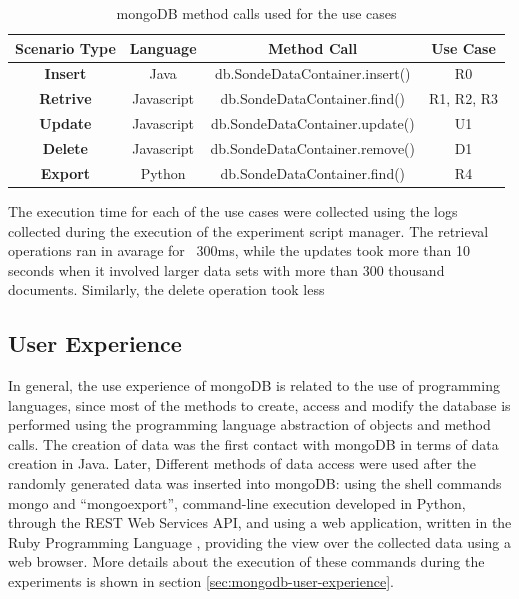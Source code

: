 \begin{table}
    \begin{center}
        \begin{tabular}{|c|c|c|c|}\hline
        \textbf{Scenario Type} & \textbf{Language} & \textbf{Method Call} & \textbf{Use Case}\\\hline 
        \textbf{Insert} & Java & db.SondeDataContainer.insert() & R0\\\hline
        \textbf{Retrive} & Javascript & db.SondeDataContainer.find() & R1, R2, R3\\\hline 
        \textbf{Update} & Javascript & db.SondeDataContainer.update() & U1\\\hline 
        \textbf{Delete} & Javascript & db.SondeDataContainer.remove() & D1\\\hline
        \textbf{Export} & Python & db.SondeDataContainer.find() & R4\\\hline
        \end{tabular}
        \caption{mongoDB method calls used for the use cases}
    \end{center}
    \label{tab:experiment-scenarios-mongo-methods}
\end{table}

The execution time for each of the use cases were collected using the logs
collected during the execution of the experiment script manager. The retrieval
operations ran in avarage for ~300ms, while the updates took more than 10
seconds when it involved larger data sets with more than 300 thousand
documents. Similarly, the delete operation took less 

\subsection{User Experience}
\label{sec:experiments-user-experimence}

In general, the use experience of mongoDB is related to the use of programming
languages, since most of the methods to create, access and modify the database
is performed using the programming language abstraction of objects and method
calls. The creation of data was the first contact with mongoDB in terms
of data creation in Java. Later, Different methods of data access were used
after the randomly generated data was inserted into mongoDB: using the shell
commands mongo and ``mongoexport'', command-line execution developed in
Python, through the REST Web Services API, and using a web application,
written in the Ruby Programming Language \cite{ruby}, providing the view over
the collected data using a web browser. More details about the execution of
these commands during the experiments is shown in section
\ref{sec:mongodb-user-experience}.


